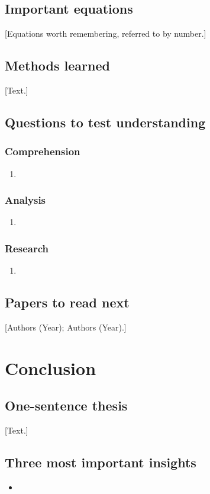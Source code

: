 \documentclass{lrreview}
\begin{document}
\subsection{Important equations}
[Equations worth remembering, referred to by number.]
\subsection{Methods learned}
[Text.]
\subsection{Questions to test understanding}
\subsubsection{Comprehension}
\begin{enumerate}
  \item\relax [Question.]
\end{enumerate}
\subsubsection{Analysis}
\begin{enumerate}
  \item\relax [Question.]
\end{enumerate}
\subsubsection{Research}
\begin{enumerate}
  \item\relax [Question.]
\end{enumerate}
\subsection{Papers to read next}
[Authors (Year); Authors (Year).]

\section{Conclusion}

\subsection{One-sentence thesis}
[Text.]
\subsection{Three most important insights}
\begin{itemize}
  \item\relax [Insight.]
\end{itemize}
\end{document}
